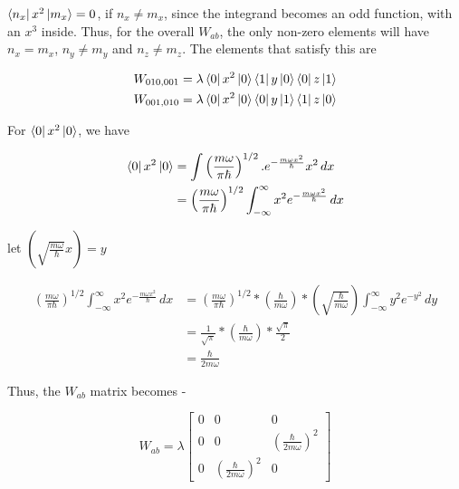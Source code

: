    $\bra{n_x}x^2\ket{m_x} = 0$, if $n_x \neq m_x$, since the integrand becomes an odd function, with an $x^3$ inside. Thus, for the overall $W_{ab}$, the only non-zero elements will have $n_x = m_x$, $n_y \neq m_y$ and $n_z \neq m_z$. The elements that satisfy this are 

    \begin{gather*}
        W_{010, 001} = \lambda\bra{0}x^2\ket{0}\bra{1}y\ket{0}\bra{0}z\ket{1} \\
        W_{001, 010} = \lambda\bra{0}x^2\ket{0}\bra{0}y\ket{1}\bra{1}z\ket{0}
    \end{gather*}

    For $\bra{0}x^2\ket{0}$, we have

    \begin{equation*}
        \begin{split}
            \bra{0}x^2\ket{0} & = \int \left( \frac{m\omega}{\pi\hbar}\right)^{1/2} . e^{-\frac{m\omega x^2}{\hbar}} x^2 \, dx \\
            & = \left( \frac{m\omega}{\pi\hbar}\right)^{1/2} \int_{-\infty}^{\infty}x^2 e^{-\frac{m\omega x^2}{\hbar}} \, dx \\
        \end{split}
    \end{equation*}

    let $\left( \sqrt{\frac{m\omega}{\hbar}} x \right) = y$

    \begin{equation*}
        \begin{split}
            \left( \frac{m\omega}{\pi\hbar}\right)^{1/2} \int_{-\infty}^{\infty}x^2 e^{-\frac{m\omega x^2}{\hbar}} \, dx & = \left( \frac{m\omega}{\pi\hbar}\right)^{1/2} * \left( \frac{\hbar}{m\omega} \right) * \left( \sqrt{\frac{\hbar}{m\omega}} \right) \int_{-\infty}^{\infty}y^2 e^{-y^2} \, dy \\
            & = \frac{1}{\sqrt{\pi}} * \left( \frac{\hbar}{m\omega} \right) * \frac{\sqrt{\pi}}{2} \\
            & = \frac{\hbar}{2m\omega}
        \end{split}
    \end{equation*}

    Thus, the $W_{ab}$ matrix becomes -

    \begin{equation*}
        W_{ab} = \lambda
        \begin{bmatrix}
            0 & 0 & 0 \\
            0 & 0 & \left( \frac{\hbar}{2m\omega} \right)^2 \\
            0 & \left( \frac{\hbar}{2m\omega} \right)^2 & 0 
        \end{bmatrix}
    \end{equation*}

